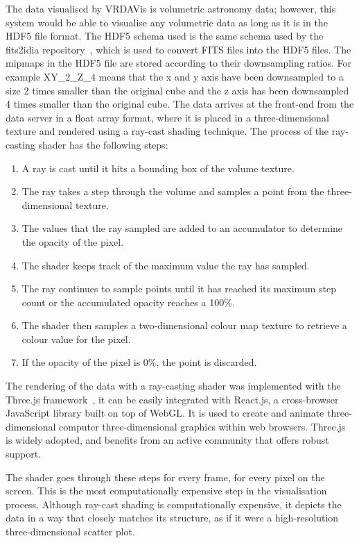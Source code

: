 The data visualised by VRDAVis is volumetric astronomy data; however, this system would be able to visualise any volumetric data as long as it is in the HDF5 file format.
The HDF5 schema used is the same schema used by the fits2idia repository~\cite{fits2idia}, which is used to convert FITS files into the HDF5 files.
The mipmaps in the HDF5 file are stored according to their downsampling ratios.
For example XY\_2\_Z\_4 means that the x and y axis have been downsampled to a size 2 times smaller than the original cube and the z axis has been downsampled 4 times smaller than the original cube. 
The data arrives at the front-end from the data server in a float array format, where it is placed in a three-dimensional texture and rendered using a ray-cast shading technique.
The process of the ray-casting shader has the following steps:
\begin{enumerate}
  \item A ray is cast until it hits a bounding box of the volume texture.
  \item The ray takes a step through the volume and samples a point from the three-dimensional texture.
  \item The values that the ray sampled are added to an accumulator to determine the opacity of the pixel.
  \item The shader keeps track of the maximum value the ray has sampled.
  \item The ray continues to sample points until it has reached its maximum step count or the accumulated opacity reaches a 100\%.
  \item The shader then samples a two-dimensional colour map texture to retrieve a colour value for the pixel.
  \item If the opacity of the pixel is 0\%, the point is discarded.
\end{enumerate}

The rendering of the data with a ray-casting shader was implemented with the Three.js framework~\cite{Danchilla2012}, it can be easily integrated with React.js, a cross-browser JavaScript library built on top of WebGL. 
It is used to create and animate three-dimensional computer three-dimensional graphics within web browsers.
Three.js is widely adopted, and benefits from an active community that offers robust support. 

The shader goes through these steps for every frame, for every pixel on the screen. %
This is the most computationally expensive step in the visualisation process. 
Although ray-cast shading is computationally expensive, it depicts the data in a way that closely matches its structure, as if it were a high-resolution three-dimensional scatter plot.

